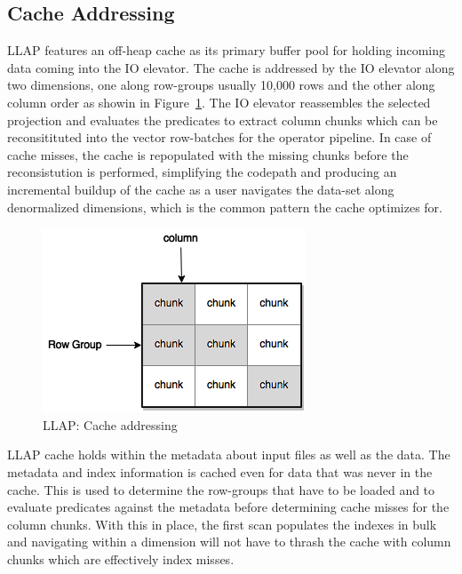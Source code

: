 \subsection{Cache Addressing}

LLAP features an off-heap cache as its primary buffer pool for holding incoming data coming into
the IO elevator. The cache is addressed by the IO elevator along two dimensions, one along row-groups usually 10,000 rows and
the other along column order as showin in Figure~\ref{fig:cache_chunks}. The IO elevator reassembles the selected projection
and evaluates the predicates to extract column chunks which can be reconsitituted into the vector row-batches for the operator
pipeline. In case of cache misses, the cache is repopulated with the missing chunks before the reconsistution is performed,
simplifying the codepath and producing an incremental buildup of the cache as a user navigates the data-set along denormalized
dimensions, which is the common pattern the cache optimizes for.

\begin{figure}[H]
\centering
\includegraphics[width=0.8\columnwidth]{figures/cache-groups.png}
\caption{LLAP: Cache addressing}
\label{fig:cache_chunks}
\end{figure} 

LLAP cache holds within the metadata about input files as well as the data. The metadata and index information is cached even 
for data that was never in the cache. This is used to determine the row-groups that have to be loaded and to evaluate predicates
against the metadata before determining cache misses for the column chunks. With this in place, the first scan populates the indexes
in bulk and navigating within a dimension will not have to thrash the cache with column chunks which are effectively index misses.

